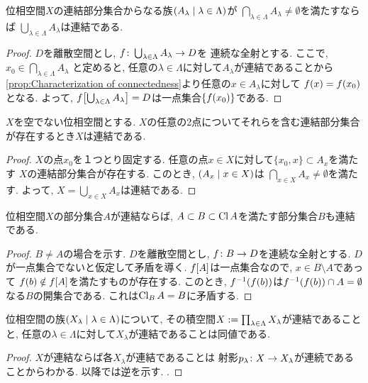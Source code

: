 \documentclass[uplatex, dvipdfmx, a4paper, 12pt, class=jsbook, crop=false]{standalone}
\begin{document}
\begin{proposition}
	\label{prop:Sum of every connected subsets in a family having intersection is connected}
	位相空間$ X $の連結部分集合からなる族$ \setfamily{A_\lambda}{\lambda \in \Lambda} $が
	$ \bigcap_{\lambda \in \Lambda} A_\lambda \neq \emptyset $を満たすならば
	$ \bigcup_{\lambda \in \Lambda} A_\lambda $は連結である.
\end{proposition}

\begin{proof}
	$ D $を離散空間とし, $ f\colon\bigcup_{\lambda \in \Lambda} A_\lambda\to D $を
	連続な全射とする. ここで, $ x_0 \in \bigcap_{\lambda \in \Lambda} A_\lambda $
	と定めると, 任意の$ \lambda \in \Lambda $に対して$ A_\lambda $が連結であることから
	\cref{prop:Characterization of connectedness}より任意の$ x \in A_\lambda $に対して
	$ \mappt{f}{x} = \mappt{f}{x_0} $となる.
	よって, $ \mapset{f}{\bigcup_{\lambda \in \Lambda} A_\lambda}= D $は一点集合$ \{\mappt{f}{x_0}\} $である.
\end{proof}

\begin{corollary}
	$ X $を空でない位相空間とする.
	$ X $の任意の2点についてそれらを含む連結部分集合が存在するとき$ X $は連結である.
\end{corollary}

\begin{proof}
	$ X $の点$ x_0 $を１つとり固定する. 任意の点$ x \in X $に対して$ \{x_0, x\} \subset A_x $を満たす
	$ X $の連結部分集合が存在する. このとき, $ \setfamily{A_x}{x \in X} $は
	$ \bigcap_{x \in X} A_x \neq \emptyset$を満たす. よって, $ X = \bigcup_{x \in X} A_x $は連結である.
\end{proof}

\begin{proposition}
	\label{prop:Closure of a connected subspace is connected}
	位相空間$ X $の部分集合$ A $が連結ならば, $ A \subset B \subset \mathop{\mathrm{Cl}}\nolimits A $を満たす部分集合$ B $も連結である.
\end{proposition}

\begin{proof}
	$ B \neq A $の場合を示す. $ D $を離散空間とし, $ f\colon B\to D $を連続な全射とする.
	$ D $が一点集合でないと仮定して矛盾を導く.
	$ \mapset{f}{A} $は一点集合なので, $ x \in B \setminus A $であって
	$ \mappt{f}{b} \notin \mapset{f}{A} $を満たすものが存在する.
	このとき, $ \mapinvpt{f}{\mappt{f}{b}} $は$ \mapinvpt{f}{\mappt{f}{b}} \cap A = \emptyset $なる$ B $の開集合である.
	これは$ \mathop{\mathrm{Cl}}\nolimits_B A = B $に矛盾する.
\end{proof}

\begin{proposition}
	\label{prop:A product space of connected spaces is connected}
	位相空間の族$ \setfamily{X_\lambda}{\lambda \in \Lambda} $について,
	その積空間$ X \mathrel{:=} \prod_{\lambda \in \Lambda} X_\lambda $が連結であることと,
	任意の$ \lambda \in \Lambda $に対して$ X_\lambda $が連結であることは同値である.
\end{proposition}

\begin{proof}
	$ X $が連結ならば各$ X_\lambda $が連結であることは
	射影$ p_\lambda\colon X\to X_\lambda $が連続であることからわかる.
	以降では逆を示す.
	\WIP.
\end{proof}
\end{document}
